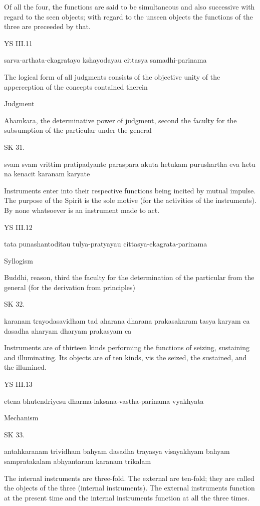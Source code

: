 Of all the four, the functions are said to be simultaneous and also successive
with regard to the seen objects;
with regard to the unseen objects
the functions of the three are preceeded by that.

YS III.11

    sarva-arthata-ekagratayo kshayodayau cittasya samadhi-parinama

    The logical form of all judgments consists of the objective unity of the apperception of the concepts contained therein

    Judgment

    Ahamkara, the determinative power of judgment, second the faculty for the subsumption of the particular under the general

SK 31.

svam svam vrittim pratipadyante paraspara akuta hetukam
purushartha eva hetu na kenacit karanam karyate

Instruments enter into their respective functions being incited by mutual impulse.
The purpose of the Spirit is the sole motive (for the activities of the instruments).
By none whatsoever is an instrument made to act.

YS III.12

    tata punashantoditau tulya-pratyayau cittasya-ekagrata-parinama

    Syllogism

    Buddhi, reason, third the faculty for the determination of the particular from the general (for the derivation from principles)

SK 32.

karanam trayodasavidham tad aharana dharana prakasakaram
tasya karyam ca dasadha aharyam dharyam prakasyam ca

Instruments are of thirteen kinds performing the functions of
seizing, sustaining and illuminating.
Its objects are of ten kinds, vis
the seized, the sustained, and the illumined.

YS III.13

    etena bhutendriyesu dharma-laksana-vastha-parinama vyakhyata

    Mechanism

SK 33.

antahkaranam trividham bahyam dasadha trayasya visayakhyam
bahyam sampratakalam abhyantaram karanam trikalam

The internal instruments are three-fold.
The external are ten-fold; they are called the objects of the three (internal instruments).
The external instruments function at the present time and
the internal instruments function at all the three times.


